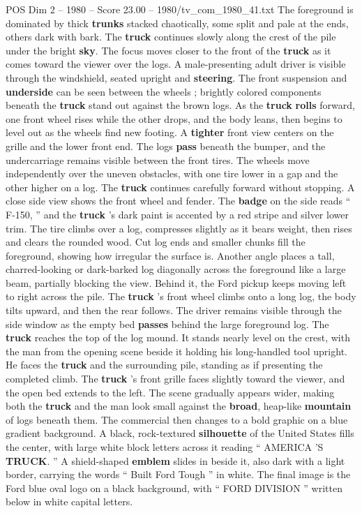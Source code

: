 \begin{textsample}{POS Dim 2 – 1980 – Score 23.00 – 1980/tv\_com\_1980\_41.txt}
The foreground is dominated by thick \textbf{trunks} stacked chaotically, some split and pale at the ends, others dark with bark.
The \textbf{truck} continues slowly along the crest of the pile under the bright \textbf{sky}.
The focus moves closer to the front of the \textbf{truck} as it comes toward the viewer over the logs.
A male-presenting adult driver is visible through the windshield, seated upright and \textbf{steering}.
The front suspension and \textbf{underside} can be seen between the wheels ; brightly colored components beneath the \textbf{truck} stand out against the brown logs.
As the \textbf{truck} \textbf{rolls} forward, one front wheel rises while the other drops, and the body leans, then begins to level out as the wheels find new footing.
A \textbf{tighter} front view centers on the grille and the lower front end.
The logs \textbf{pass} beneath the bumper, and the undercarriage remains visible between the front tires.
The wheels move independently over the uneven obstacles, with one tire lower in a gap and the other higher on a log.
The \textbf{truck} continues carefully forward without stopping.
A close side view shows the front wheel and fender.
The \textbf{badge} on the side reads “ F-150, ” and the \textbf{truck} ’s dark paint is accented by a red stripe and silver lower trim.
The tire climbs over a log, compresses slightly as it bears weight, then rises and clears the rounded wood.
Cut log ends and smaller chunks fill the foreground, showing how irregular the surface is.
Another angle places a tall, charred-looking or dark-barked log diagonally across the foreground like a large beam, partially blocking the view.
Behind it, the Ford pickup keeps moving left to right across the pile.
The \textbf{truck} ’s front wheel climbs onto a long log, the body tilts upward, and then the rear follows.
The driver remains visible through the side window as the empty bed \textbf{passes} behind the large foreground log.
The \textbf{truck} reaches the top of the log mound.
It stands nearly level on the crest, with the man from the opening scene beside it holding his long-handled tool upright.
He faces the \textbf{truck} and the surrounding pile, standing as if presenting the completed climb.
The \textbf{truck} ’s front grille faces slightly toward the viewer, and the open bed extends to the left.
The scene gradually appears wider, making both the \textbf{truck} and the man look small against the \textbf{broad}, heap-like \textbf{mountain} of logs beneath them.
The commercial then changes to a bold graphic on a blue gradient background.
A black, rock-textured \textbf{silhouette} of the United States fills the center, with large white block letters across it reading “ AMERICA ’S \textbf{TRUCK}. ” A shield-shaped \textbf{emblem} slides in beside it, also dark with a light border, carrying the words “ Built Ford Tough ” in white.
The final image is the Ford blue oval logo on a black background, with “ FORD DIVISION ” written below in white capital letters.

\end{textsample}
